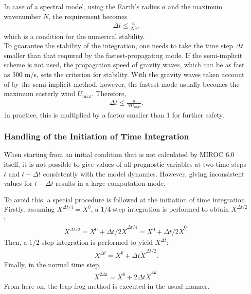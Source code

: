 In case of a spectral model, using the Earth's radius \(a\) and the
maximum wavenumber \(N\), the requirement becomes
\begin{eqnarray}
   \Delta t \le \frac{a}{N c},
\end{eqnarray}
which is a condition for the numerical stability.\\

To guarantee the stability of the integration, one needs to take the time step  \(\Delta t\) smaller than that required by the fastest-propagating mode.
If the semi-implicit scheme is not used, the propagation speed of gravity waves, which can be as fast as 300 m$/$s, sets the criterion for stability.
With the gravity waves taken account of by the semi-implicit method, however, the fastest mode usually becomes the maximum easterly wind $U_{\mathrm{max}}$. Therefore,
\begin{eqnarray}
   \Delta t \le \frac{a}{N U_{max}} .
\end{eqnarray}
In practice, this is multiplied by a factor smaller than 1 for further safety.

\hypertarget{handling-of-the-initiation-of-time-integration}{%
\subsubsection{Handling of the Initiation of Time
Integration}\label{handling-of-the-initiation-of-time-integration}}

When starting from an initial condition that is not calculated by
MIROC 6.0 itself, it is not possible to give values of all prognostic variables at two time steps \(t\)
and \(t-\Delta t\) consistently with the model dynamics.
However, giving inconsistent values for \(t-\Delta t\) results in a large computation mode.

To avoid this, a special procedure is followed at the initiation of time integration.
Firstly, assuming \(X^{\Delta t/4} = X^0\), a \(1/4\)-step integration is performed to obtain $X^{\Delta t/2}$:
\begin{eqnarray}
  X^{\Delta t/2} = X^0 + \Delta t/2 \dot{X}^{\Delta t/4}
                 = X^0 + \Delta t/2 \dot{X}^0.
\end{eqnarray}
Then, a \(1/2\)-step integration is performed to yield $X^{\Delta t}$:
\begin{eqnarray}
  X^{\Delta t}   = X^0 + \Delta t \dot{X}^{\Delta t/2}.
\end{eqnarray}
Finally, in the normal time step,
\begin{eqnarray}
  X^{2\Delta t}   = X^0 + 2 \Delta t \dot{X}^{\Delta t}.
\end{eqnarray}
From here on, the leap-frog method is executed in the usual manner.
